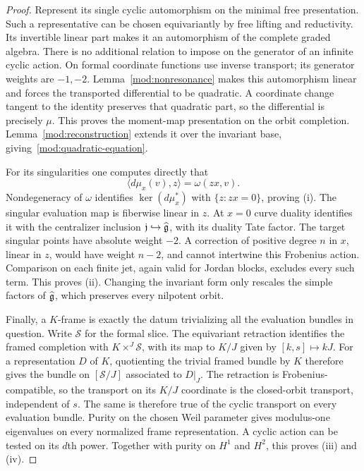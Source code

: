 \begin{proof}
Represent its single cyclic automorphism on the minimal free
presentation. Such a representative can be chosen equivariantly by
free lifting and reductivity. Its invertible linear part makes it an
automorphism of the complete graded algebra. There is no additional
relation to impose on the generator of an infinite cyclic action.
On formal coordinate functions use inverse transport; its generator
weights are $-1,-2$. Lemma~\ref{mod:nonresonance} makes this
automorphism linear and forces the transported differential to be
quadratic. A coordinate change tangent to the identity preserves
that quadratic part, so the differential is precisely $\mu$.
This proves the moment-map presentation on the orbit completion.
Lemma~\ref{mod:reconstruction} extends it over the invariant base,
giving~\eqref{mod:quadratic-equation}.

For its singularities one computes directly that
\[
 \langle d\mu_x(v),z\rangle=\omega(zx,v).
\]
Nondegeneracy of $\omega$ identifies
$\ker(d\mu_x^*)$ with $\{z:zx=0\}$, proving \textup{(i)}.
The singular evaluation map is fiberwise linear in $z$. At $x=0$
curve duality identifies it with the centralizer inclusion
$\mathfrak j\hookrightarrow\widehat{\mathfrak g}$, with its duality Tate factor.
The target singular points have absolute weight $-2$. A correction
of positive degree $n$ in $x$, linear in $z$, would have weight
$n-2$, and cannot intertwine this Frobenius action. Comparison on
each finite jet, again valid for Jordan blocks, excludes every such
term. This proves \textup{(ii)}. Changing the invariant form only
rescales the simple factors of $\widehat{\mathfrak g}$, which preserves every
nilpotent orbit.

Finally, a $K$-frame is exactly the datum trivializing all the
evaluation bundles in question. Write $\mathscr S$ for the formal
slice. The equivariant retraction identifies the framed completion
with $K\times^J\mathscr S$, with its map to $K/J$ given by
$[k,s]\mapsto kJ$. For a representation $D$ of $K$, quotienting the
trivial framed bundle by $K$ therefore gives the bundle on
$[\mathscr S/J]$ associated to $D|_J$. The retraction is
Frobenius-compatible, so the transport on its $K/J$ coordinate is
the closed-orbit transport, independent of $s$. The same is therefore
true of the cyclic transport on every evaluation bundle.
Purity on the chosen Weil
parameter gives modulus-one eigenvalues on every normalized frame
representation. A cyclic action can be tested on its $d$th power.
Together with purity on $H^1$ and $H^2$, this proves
\textup{(iii)} and \textup{(iv)}.
\end{proof}

